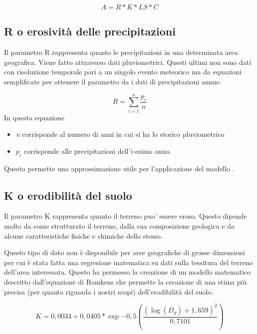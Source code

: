 \begin{equation} \label{eq:main_not_P}
A = R * K * LS * C
\end{equation}

\subsection{R o erosività delle precipitazioni}
Il parametro R rappresenta quanto le precipitazioni in una determinata area geografica. Viene fatto attraverso dati pluviometrici. Questi ultimi non sono dati con risoluzione temporale pari a un singolo evento meteorico ma da equazioni semplificate per ottenere il parametro da i dati di precipitazioni annue.

\begin{equation}\label{eq:r}
	R = \sum_{i=1}^{n} \frac{p_i}{n}
\end{equation}
In questa equazione
\begin{itemize}
	\item \textit{n} corrisponde al numero di anni in cui si ha lo storico pluviometrico
	\item \textit{$p_i$} corrisponde alle precipitazioni dell'$i$-esimo anno.
\end{itemize}

Questo permette una approssimazione utile per l'applicazione del modello \rusle.

\subsection{K o erodibilità del suolo}

Il parametro K rappresenta quanto il terreno puo' essere eroso. Questo dipende molto da come  strutturato il terreno, dalla sua composizione geologica e da alcune caratteristiche fisiche e chimiche dello stesso.

Questo tipo di dato non è disponibile per aree geografiche di grosse dimensioni per cui è stata fatta una regresione matematica su dati sulla tessitura del terreno dell'area interessata. Questo ha permesso la creazione di un modello matematico descritto dall'equazione di Romkens che permette la creazione di una stima più precisa (per quanto riguarda i nostri scopi) dell'erodibilità del suolo.

\begin{equation}\label{eq:k}
	K=0,0034 + 0,0405 * \exp{-0,5\left( \dfrac{(\log(D_g)+1,659)^2}{0,7101} \right) }
\end{equation}

